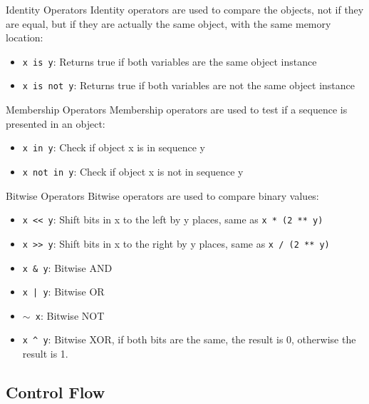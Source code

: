 \documentclass[aspectratio=169]{beamer}
\begin{document}
\begin{frame}{Identity Operators}
    Identity operators are used to compare the objects, not if they are equal, but if they are actually the same object, with the same memory location:
    \begin{itemize}
        \item \texttt{x is y}: Returns true if both variables are the same object instance
        \item \texttt{x is not y}: Returns true if both variables are not the same object instance
    \end{itemize}
\end{frame}

\begin{frame}{Membership Operators}
    Membership operators are used to test if a sequence is presented in an object:
    \begin{itemize}
        \item \texttt{x in y}: Check if object x is in sequence y
        \item \texttt{x not in y}: Check if object x is not in sequence y
    \end{itemize}
\end{frame}

\begin{frame}{Bitwise Operators}
    Bitwise operators are used to compare binary values:
    \begin{itemize}
        \item \texttt{x << y}: Shift bits in x to the left by y places, same as \texttt{x * (2 ** y)}
        \item \texttt{x >> y}: Shift bits in x to the right by y places, same as \texttt{x / (2 ** y)}
        \item \texttt{x \& y}: Bitwise AND
        \item \texttt{x | y}: Bitwise OR
        \item \texttt{$\sim$ x}: Bitwise NOT
        \item \texttt{x \string^ y}: Bitwise XOR, if both bits are the same, the result is 0, otherwise the result is 1.
    \end{itemize}
\end{frame}


\subsection{Control Flow}
\end{document}
